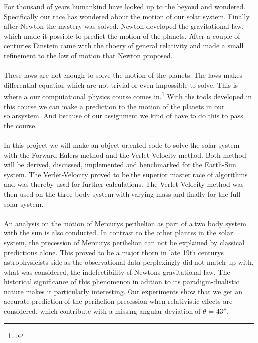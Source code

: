 For thousand of years humankind have looked up to the beyond and wondered. Specifically our race has wondered about the motion of our solar system. Finally after Newton the mystery was solved. Newton developed the gravitational law, which made it possible to predict the motion of the planets. After a couple of centuries Einstein came with the thoery of general relativity and made a small refinement to the law of motion that Newton proposed. 
\\
\\
These laws are not enough to solve the motion of the planets. The laws makes differential equation which are not trivial or even impossible to solve. This is where a our computational physics course comes in.\footnote{\href{http://www.uio.no/studier/emner/matnat/fys/FYS3150/h17/index.html}{\color{blue}{Semester page for FYS3150 - Autumn 2017}}.} With the tools developed in this course we can make a prediction to the motion of the planets in our solarsystem. And because of our assignment we kind of have to do this to pass the course.\cite{project3}
\\
\\
In this project we will make an object oriented code to solve the solar system with the Forward Eulers method and the Verlet-Velocity method. Both method will be derived, discussed, implemented and benchmarked for the Earth-Sun system. The Verlet-Velocity proved to be the superior master race of algorithms and was thereby used for further calculations. The Verlet-Velocity method was then used on the three-body system with varying mass and finally for the full solar system.
\\
\\
An analysis on the motion of Mercurys perihelion as part of a two body system with the sun is also conducted. In contrast to the other plantes in the solar system, the precession of Mercurys perihelion can not be explained by classical predictions alone. This proved to be a major thorn in late 19th centurys astrophysicists side as the observational data perplexingly did not match up with, what was considered, the indefectibility of Newtons gravitational law. The historical significance of this phenomenon in adition to its paradigm-dualistic nature makes it particularly interesting. Our experiments show that we get an accurate prediction of the perihelion precession when relativistic effects are considered, which contribute with a missing angular deviation of $\theta$ = $43''$.
